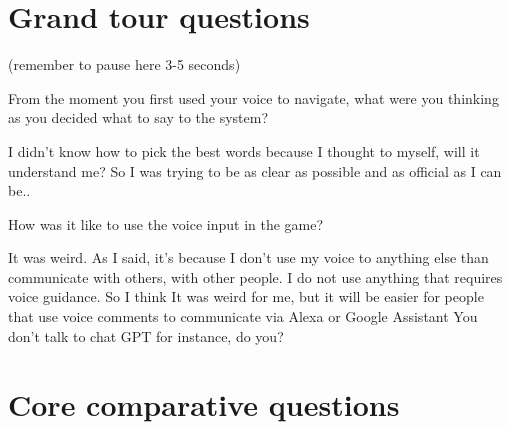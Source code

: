 \section{Grand tour questions}
(remember to pause here 3-5 seconds)

\begin{QandA}


   \item From the moment you first used your voice to navigate, what were you thinking as you decided what to say to the system?

         \begin{answered}
            I didn't know how to pick the best words because I thought to myself, will it understand me?
            So I was trying to be as clear as possible and as official as I can be..
         \end{answered}

    \item How was it like to use the voice input in the game?
         \begin{answered}
            It was weird.
            As I said, it's because I don't use my voice to anything else than communicate with others, with other people.
            I do not use anything that requires voice guidance.
            So I think It was weird for me, but it will be easier for people that use voice comments to communicate via Alexa or Google Assistant You don't talk to chat GPT for instance, do you?
         \end{answered}


\end{QandA}




\section{Core comparative questions}

